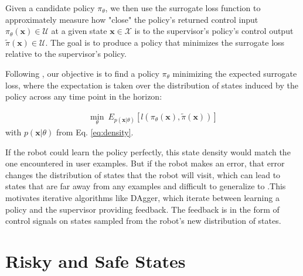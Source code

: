 \documentclass[10pt, conference]{ieeeconf}      %
\newcommand{\bx}{\mathbf{x}}
\begin{document}
Given a candidate policy $\pi_{\theta}$, we then use the surrogate loss function to approximately measure how "close" the policy's
returned control input $\pi_{\theta}(\bx)\in \mathcal{U}$ at a given state $\bx\in \mathcal{X}$ is to the supervisor's policy's control output
$\tilde{\pi}(\bx)\in \mathcal{U}$. The goal is to produce a policy that minimizes the surrogate loss relative to the supervisor's policy.


Following \cite{ross2010reduction}, our objective is to find a policy $\pi_{\theta}$ minimizing the expected surrogate loss, where the expectation is taken over the distribution of states induced by the policy across any time point in the horizon:

 \vspace{-2ex}
\begin{align}\label{eq:LFD_obj}
\underset{\theta}{\min} \: E_{p(\bx|\theta)} [l(\pi_\theta(\bx),\tilde{\pi}(\bx))]
\end{align}
with $p(\bx|\theta)$ from Eq. \ref{eq:density}.

 If the robot could learn the policy  perfectly, this state density would match the one encountered in user examples. But if the robot makes an error, that error changes the distribution of states that the robot will visit, which can lead to states that are far away from any examples and difficult to generalize to \cite{pomerleau1989alvinn}.This motivates iterative algorithms like DAgger, which iterate between learning a policy and the supervisor providing feedback. The feedback is in the form of control signals on states sampled from the robot's new distribution of states. 

\section{Risky and Safe States}
\end{document}
